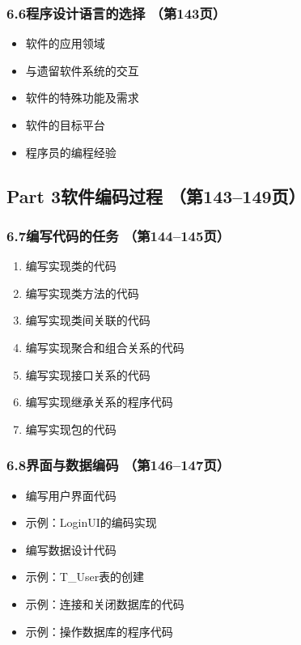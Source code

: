 \documentclass[12pt,a4paper]{ctexart}
\begin{document}
\subsubsection{6.6\quad 程序设计语言的选择 \hfill（第143页）}
\begin{itemize}
    \item 软件的应用领域
    \item 与遗留软件系统的交互
    \item 软件的特殊功能及需求
    \item 软件的目标平台
    \item 程序员的编程经验
\end{itemize}

\subsection{Part 3\quad 软件编码过程 \hfill（第143--149页）}

\subsubsection{6.7\quad 编写代码的任务 \hfill（第144--145页）}
\begin{enumerate}
    \item 编写实现类的代码
    \item 编写实现类方法的代码
    \item 编写实现类间关联的代码
    \item 编写实现聚合和组合关系的代码
    \item 编写实现接口关系的代码
    \item 编写实现继承关系的程序代码
    \item 编写实现包的代码
\end{enumerate}

\subsubsection{6.8\quad 界面与数据编码 \hfill（第146--147页）}
\begin{itemize}
    \item 编写用户界面代码
    \item 示例：LoginUI的编码实现
    \item 编写数据设计代码
    \item 示例：T\_User表的创建
    \item 示例：连接和关闭数据库的代码
    \item 示例：操作数据库的程序代码
\end{itemize}
\end{document}
